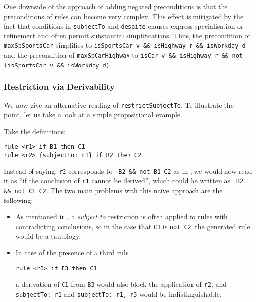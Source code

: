 One downside of the approach of adding negated preconditions is that the
preconditions of rules can become very complex. This effect is mitigated by
the fact that conditions in \texttt{subjectTo} and \texttt{despite} clauses
express specialisation or refinement and often permit substantial
simplifications. Thus, the precondition of \texttt{maxSpSportsCar} simplifies
to \texttt{isSportsCar v \&\& isHighway r \&\& isWorkday d} and the
precondition of \texttt{maxSpCarHighway} to
\texttt{isCar v \&\& isHighway r \&\& not (isSportsCar v \&\& isWorkday d)}.


\subsubsection{Restriction via Derivability}\label{sec:restr_deriv}

We now give an alternative reading of \texttt{restrictSubjectTo}. To
illustrate the point, let us take a look at a simple propositional example.

\begin{example}\label{ex:small_propositional} Take the definitions:
\begin{lstlisting}
rule <r1> if B1 then C1
rule <r2> {subjectTo: r1} if B2 then C2
\end{lstlisting}
\end{example}

Instead of saying: \texttt{r2} corresponds to
\texttt{ B2 \&\& not B1  C2} 
as in , we would now read it as
``if the conclusion of \texttt{r1} cannot be derived'', 
which could be written as
\texttt{ B2 \&\& not C1  C2}.
The two main problems with this naive approach are the following:
\begin{itemize}
\item As mentioned in , a \emph{subject to}
  restriction is often applied to rules with contradicting conclusions, so in
  the case that \texttt{C1} is \texttt{not C2}, the generated rule would be a
  tautology.
\item In case of the presence of a third rule
\begin{lstlisting}[frame=none]
rule <r3> if B3 then C1
\end{lstlisting}
a derivation of \texttt{C1} from \texttt{B3} would also block the application
of \texttt{r2}, and \texttt{subjectTo: r1} and \texttt{subjectTo: r1, r3}
would be indistinguishable.
\end{itemize}

